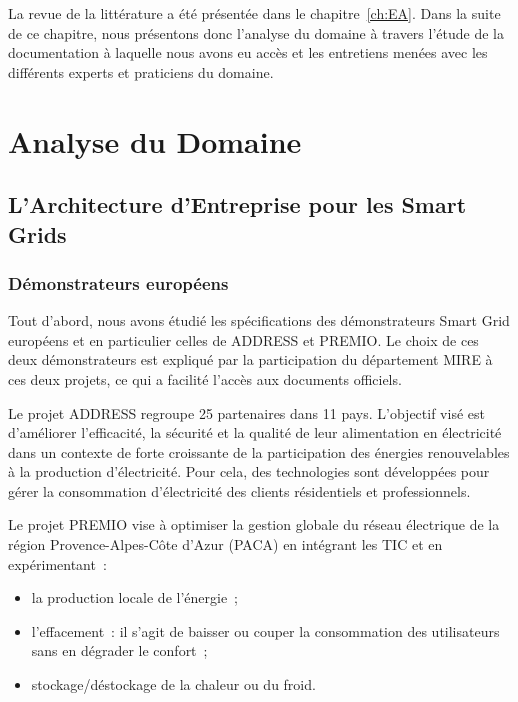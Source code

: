 La revue de la littérature a été présentée dans le chapitre~\ref{ch:EA}.
Dans la suite de ce chapitre, nous présentons donc l'analyse du domaine à travers l'étude
de la documentation à laquelle nous avons eu accès et les entretiens menées avec les différents
experts et praticiens du domaine.


\section{Analyse du Domaine}

    \subsection{L'Architecture d'Entreprise pour les Smart Grids}
    \subsubsection{Démonstrateurs européens}
    \label{sec:DemonstrateursSG}

Tout d'abord, nous avons étudié les spécifications des démonstrateurs Smart Grid
européens et en particulier celles de ADDRESS et PREMIO. Le choix de ces deux
démonstrateurs est expliqué par la participation du département MIRE à ces deux
projets, ce qui a facilité l'accès aux documents officiels.



Le projet ADDRESS regroupe 25 partenaires dans 11 pays. L'objectif visé est
d'améliorer l'efficacité, la sécurité et la qualité de leur alimentation en
électricité dans un contexte de forte croissante de la participation des
énergies renouvelables à la production d'électricité. Pour cela, des
technologies sont développées pour gérer la consommation d'électricité des
clients résidentiels et professionnels.

Le projet PREMIO vise à optimiser la gestion globale du réseau électrique de la
région Provence-Alpes-Côte d'Azur (PACA) en intégrant les TIC et en
expérimentant~:
\begin{itemize}
	\item la production locale de l'énergie~;
	\item l'effacement~: il s'agit de baisser ou couper la consommation des utilisateurs
    sans en dégrader le confort~;
	\item stockage/déstockage de la chaleur ou du froid.
\end{itemize}

